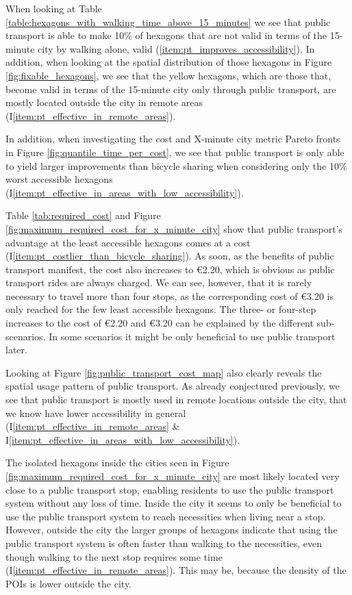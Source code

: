 When looking at Table \ref{table:hexagons_with_walking_time_above_15_minutes} we see that public transport is able to make 10\% of hexagons that are not valid in terms of the 15-minute city by walking alone, valid (\ref{item:pt_improves_accessibility}).
In addition, when looking at the spatial distribution of those hexagons in Figure \ref{fig:fixable_hexagons}, we see that the yellow hexagons, which are those that, become valid in terms of the 15-minute city only through public transport, are mostly located outside the city in remote areas (I\ref{item:pt_effective_in_remote_areas}).

In addition, when investigating the cost and X-minute city metric Pareto fronts in Figure \ref{fig:quantile_time_per_cost}, we see that public transport is only able to yield larger improvements than bicycle sharing when considering only the 10\% worst accessible hexagons (I\ref{item:pt_effective_in_areas_with_low_accessibility}).

Table \ref{tab:required_cost} and Figure \ref{fig:maximum_required_cost_for_x_minute_city} show that public transport's advantage at the least accessible hexagons comes at a cost (I\ref{item:pt_costlier_than_bicycle_sharing}).
As soon, as the benefits of public transport manifest, the cost also increases to \euro{2.20}, which is obvious as public transport rides are always charged.
We can see, however, that it is rarely necessary to travel more than four stops, as the corresponding cost of \euro{3.20} is only reached for the few least accessible hexagons.
The three- or four-step increases to the cost of \euro{2.20} and \euro{3.20} can be explained by the different sub-scenarios.
In some scenarios it might be only beneficial to use public transport later.

Looking at Figure \ref{fig:public_transport_cost_map} also clearly reveals the spatial usage pattern of public transport.
As already conjectured previously, we see that public transport is mostly used in remote locations outside the city, that we know have lower accessibility in general (I\ref{item:pt_effective_in_remote_areas} \& I\ref{item:pt_effective_in_areas_with_low_accessibility}).

The isolated hexagons inside the cities seen in Figure \ref{fig:maximum_required_cost_for_x_minute_city} are most likely located very close to a public transport stop, enabling residents to use the public transport system without any loss of time.
Inside the city it seems to only be beneficial to use the public transport system to reach necessities when living near a stop.
However, outside the city the larger groups of hexagons indicate that using the public transport system is often faster than walking to the necessities, even though walking to the next stop requires some time (I\ref{item:pt_effective_in_remote_areas}).
This may be, because the density of the POIs is lower outside the city.

